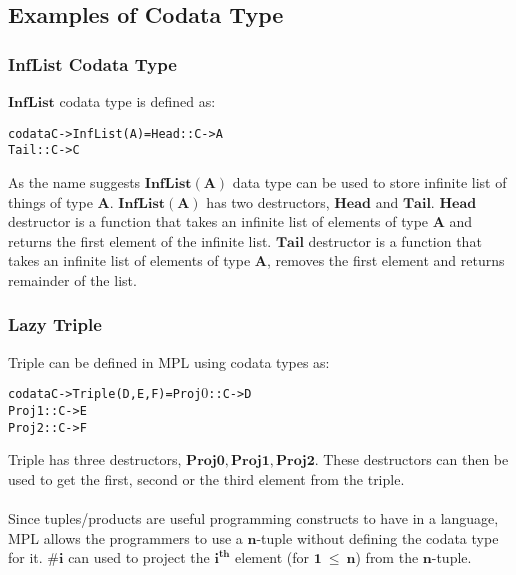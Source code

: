 \documentclass[11pt]{article}
\begin{document}
\subsection {Examples of Codata Type}
\subsubsection{InfList Codata Type}
$\mathbf{InfList}$ codata type is defined as:
\begin{alltt}
          codata C -> InfList(A) = Head :: C -> A  
                                   Tail :: C -> C  
\end{alltt}
As the name suggests $\mathbf{InfList(A)}$ data type can be used to store infinite list of things of type $\mathbf{A}$. $\mathbf{InfList(A)}$ has two destructors, $\mathbf{Head}$ and $\mathbf{Tail}$. $\mathbf{Head}$ destructor is a function that takes an infinite list of elements of type $\mathbf{A}$ and returns the first element of the infinite list. $\mathbf{Tail}$ destructor is a function that takes an infinite list of elements of type $\mathbf{A}$, removes the first element and returns remainder of the list.
\subsubsection{Lazy Triple}
Triple can be defined in MPL using codata types as:
\begin{alltt}
          codata C -> Triple(D,E,F) = Proj\(0\) :: C -> D
                                      Proj1 :: C -> E
                                      Proj2 :: C -> F

\end{alltt}
Triple has three destructors, $\mathbf{Proj0, Proj1, Proj2}$. These destructors can then be used to get the first, second or the third element from the triple.
~~\\~~\\ 
Since tuples/products are useful programming constructs to have in a language, MPL allows the programmers to use a $\mathbf{n}$-tuple without defining the codata type for it. $\mathbf{\#i}$ can used to project the \texttt{$\mathbf{i^{th}}$} element (for $\mathbf{1~\leq~n}$) from the $\mathbf{n}$-tuple.
\end{document}
